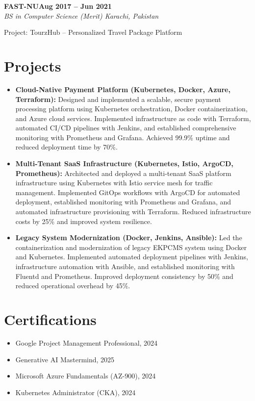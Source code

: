 \documentclass[letterpaper,10pt]{article}
\newcommand{\headingBf}[2]{
  \hspace{10pt}\textbf{#1}\hfill\textbf{#2}\\
}
\newcommand{\headingIt}[2]{
  \hspace{10pt}\textit{#1}\hfill\textit{#2}\\
}
\newenvironment{resume_list}{
  \vspace{-7pt}
  \begin{itemize}[itemsep=-2px, parsep=1pt, leftmargin=30pt]
}{
  \end{itemize}
}
\begin{document}
\headingBf{FAST-NU}{Aug 2017 -- Jun 2021}
\headingIt{BS in Computer Science (Merit) \hfill Karachi, Pakistan}{}
\begin{resume_list}
    \item Project: TourzHub -- Personalized Travel Package Platform
\end{resume_list}

\section{Projects}
\begin{itemize}
    \setlength\itemsep{3pt}
    \item \textbf{Cloud-Native Payment Platform (Kubernetes, Docker, Azure, Terraform):} Designed and implemented a scalable, secure payment processing platform using Kubernetes orchestration, Docker containerization, and Azure cloud services. Implemented infrastructure as code with Terraform, automated CI/CD pipelines with Jenkins, and established comprehensive monitoring with Prometheus and Grafana. Achieved 99.9\% uptime and reduced deployment time by 70\%.
    \item \textbf{Multi-Tenant SaaS Infrastructure (Kubernetes, Istio, ArgoCD, Prometheus):} Architected and deployed a multi-tenant SaaS platform infrastructure using Kubernetes with Istio service mesh for traffic management. Implemented GitOps workflows with ArgoCD for automated deployment, established monitoring with Prometheus and Grafana, and automated infrastructure provisioning with Terraform. Reduced infrastructure costs by 25\% and improved system resilience.
    \item \textbf{Legacy System Modernization (Docker, Jenkins, Ansible):} Led the containerization and modernization of legacy EKPCMS system using Docker and Kubernetes. Implemented automated deployment pipelines with Jenkins, infrastructure automation with Ansible, and established monitoring with Fluentd and Prometheus. Improved deployment consistency by 50\% and reduced operational overhead by 45\%.
\end{itemize}

\section{Certifications}
\begin{itemize}
    \item Google Project Management Professional, 2024
    \item Generative AI Mastermind, 2025
    \item Microsoft Azure Fundamentals (AZ-900), 2024
    \item Kubernetes Administrator (CKA), 2024
\end{itemize}

\vspace*{\fill}
\end{document}
